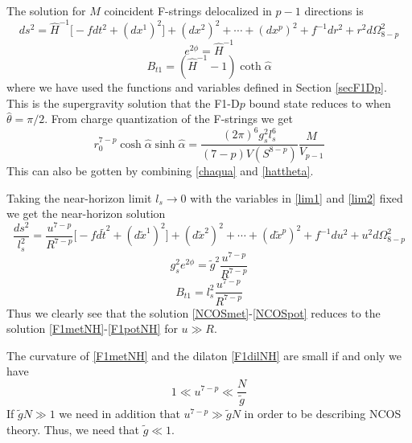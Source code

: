 \documentclass[a4paper,twoside,titlepage,12pt]{article}
\begin{document}
The solution for $M$ coincident F-strings delocalized in $p-1$ 
directions is
%
\begin{equation}
ds^2 = \hat{H}^{-1} \Big[ -f dt^2 + (dx^1)^2 \Big]
+ (dx^2)^2 + \cdots + (dx^p)^2 + f^{-1} dr^2 + r^2 d\Omega_{8-p}^2
\end{equation}
%
\begin{equation}
e^{2\phi} = \hat{H}^{-1}
\end{equation}
%
\begin{equation}
B_{t1} = (\hat{H}^{-1} -1 ) \coth \hat{\alpha}
\end{equation}
%
where we have used the functions and variables defined 
in Section \ref{secF1Dp}. This is the supergravity solution that the F1-D$p$
bound state reduces to when $\hat{\theta} = \pi/2$.
From charge quantization of the F-strings we get
%
\begin{equation}
r_0^{7-p} \cosh \hat{\alpha} \sinh \hat{\alpha}
= \frac{(2\pi)^6 g_s^2 l_s^6}{(7-p)V(S^{8-p})} \frac{M}{V_{p-1}} 
\end{equation}
%
This can also be gotten by combining \eqref{chaqua} and \eqref{hattheta}.

Taking the near-horizon limit \( l_s \rightarrow 0 \) with the
variables in \eqref{lim1} and \eqref{lim2} fixed we get the
near-horizon solution
%
\begin{equation}
\label{F1metNH}
\frac{ds^2}{l_s^2} = \frac{u^{7-p}}{R^{7-p}} 
\Big[ - f d\tilde{t}^2 + (d\tilde{x}^1)^2 \Big] 
+ (d\tilde{x}^2)^2 + \cdots + (d\tilde{x}^p)^2
+ f^{-1} du^2 + u^2 d\Omega_{8-p}^2
\end{equation}
%
\begin{equation}
\label{F1dilNH}
g_s^2 e^{2\phi} = \tilde{g}^2 \frac{u^{7-p}}{R^{7-p}}
\end{equation}
%
\begin{equation}
\label{F1potNH}
B_{t1} = l_s^2 \frac{u^{7-p}}{R^{7-p}}
\end{equation}
%
Thus we clearly see that the solution \eqref{NCOSmet}-\eqref{NCOSpot} 
reduces to the solution \eqref{F1metNH}-\eqref{F1potNH}
for \( u \gg R \).

The curvature of \eqref{F1metNH} and the dilaton \eqref{F1dilNH} are
small if and only we have
%
\begin{equation}
1 \ll u^{7-p} \ll \frac{N}{\tilde{g}}
\end{equation}
%
If \( \tilde{g} N \gg 1 \) we need in addition that 
\( u^{7-p} \gg \tilde{g} N \) in order to be describing NCOS theory.
Thus, we need that \( \tilde{g} \ll 1 \). 
\end{document}
